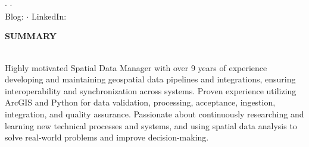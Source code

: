 \documentclass[letterpaper]{article}
\newcommand{\lineunder} {
        \vspace*{-8pt} \\
        \hspace*{-18pt} \hrulefill \\
    }
\newcommand{\header} [1] {
        \vspace{9pt}
        {\hspace*{-18pt}\vspace*{6pt} \large \textbf {#1}}
        \vspace*{-6pt} \lineunder
        \vspace{2pt}
    }
\newcommand{\cvprofile}[7]{ %
        \begin{center}
            {\Huge \textbf {#1}}\\
            \vspace{5pt}
            {\large \textbf {#2}}\\
            \vspace{4pt}
            #3 $\cdot$\enspace #4 $\cdot$\enspace #5\\
            Blog: #6
            $\cdot$\enspace
            LinkedIn: #7
        \end{center}
    }
\begin{document}



\vspace*{-30pt}

\cvprofile
    {\CVname}
    {\JobTitle}
    {\CVaddress}
    {\CVemail}
    {\CVphone}
    {\CVblogurl}
    {\CVlinkedin}

\vspace*{-6pt}



\header{SUMMARY}
Highly motivated Spatial Data Manager with over 9 years of experience developing
and maintaining geospatial data pipelines and integrations, ensuring
interoperability and synchronization across systems. 
Proven experience utilizing ArcGIS and Python for data validation, processing, acceptance,
ingestion, integration, and quality assurance. 
Passionate about continuously researching and learning new technical processes and systems, and using spatial
data analysis to solve real-world problems and improve decision-making.
\end{document}
